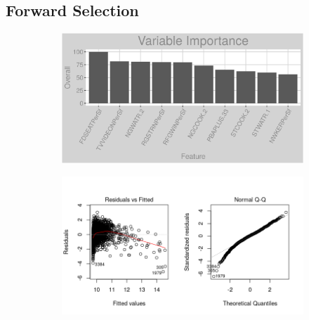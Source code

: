 \subsection{Forward Selection}
\label{appendix:natural_gas:lp}
\begin{figure}[h]
\centering
\begin{subfigure}{1\textwidth}
\centering
\includegraphics[width=.99\textwidth, height=0.3\textheight]{Images/natural_gas_psf_lp_vars.png}
\end{subfigure}
\begin{subfigure}{1\textwidth}
\centering
\includegraphics[width=.99\textwidth, height=0.475\textheight]{Images/natural_gas_psf_lp_res_1.png}
\end{subfigure}
\end{figure}
\FloatBarrier
\newpage
